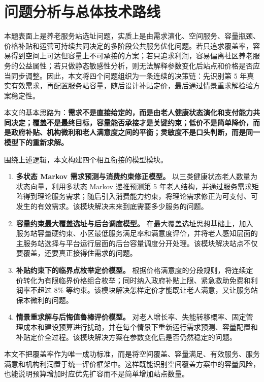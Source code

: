 \section{问题分析与总体技术路线}

本题表面上是养老服务站选址问题，实质上是由需求演化、空间服务、容量瓶颈、价格补贴和运营可持续共同决定的多阶段公共服务优化问题。若只追求覆盖率，容易得到空间上可达但容量上不可承接的方案；若只追求利润，容易偏离社区养老服务的公益属性；若只做静态敏感性分析，则无法解释参数变化后站点和价格是否应当同步调整。因此，本文将四个问题组织为一条连续的决策链：先识别第 5 年真实有效需求，再配置服务站容量，随后设计补贴定价，最后通过情景重求解检验方案稳定性。

本文的基本思路为：\textbf{需求不是直接给定的，而是由老人健康状态演化和支付能力共同决定；覆盖不是最终目标，容量能否承接才是关键约束；低价不是简单降价，而是政府补贴、机构微利和老人满意度之间的平衡；灵敏度不是口头判断，而是同一模型下的重新求解。}

围绕上述逻辑，本文构建四个相互衔接的模型模块。

\begin{enumerate}
    \item \textbf{多状态 Markov 需求预测与消费约束修正模型。} 以三类健康状态老人数量为状态向量，利用多状态 Markov 递推预测第 5 年老人结构，并通过服务需求矩阵得到理论服务需求；随后引入消费能力约束，将理论需求修正为可支付、可发生的有效需求。该模块解决未来到底需要多少服务的问题。
    \item \textbf{容量约束最大覆盖选址与后台调度模型。} 在最大覆盖选址思想基础上，加入服务站容量硬约束、小区最低服务满足率和满意度评价，并将老人感知层面的主服务站选择与平台运行层面的后台容量调度分开处理。该模块解决站点不仅要覆盖，还要真正接得住需求的问题。
    \item \textbf{补贴约束下的临界点枚举定价模型。} 根据价格满意度的分段规则，将连续定价转化为有限临界价格组合枚举；同时纳入政府补贴上限、紧急救助免费和利润率不超过 8\% 等约束。该模块解决怎样定价才能既让老人满意，又让服务站保本微利的问题。
    \item \textbf{情景重求解与后悔值鲁棒评价模型。} 对老人增长率、失能转移概率、固定管理成本和建设预算进行扰动，并在每个情景下重新运行需求预测、容量配置和补贴定价全过程。该模块解决方案在参数变化后是否仍然稳定的问题。
\end{enumerate}

本文不把覆盖率作为唯一成功标准，而是将空间覆盖、容量满足、有效服务、服务满意和机构利润置于统一评价框架中。这样既能识别空间覆盖方案中的容量风险，也能说明预算增加时应优先扩容而不是简单增加站点数量。
